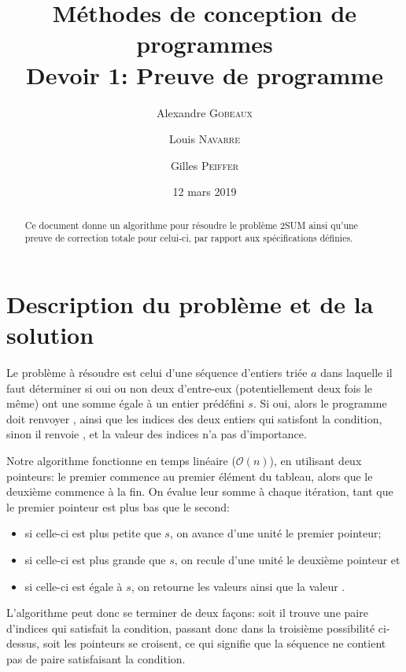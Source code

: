 \documentclass{elsarticle}
\begin{document}
\title{Méthodes de conception de programmes \\ Devoir 1: Preuve de programme}
\date{12 mars 2019}

\address[add1]{École Polytechnique, Université catholique de Louvain, Place de l'Université 1, 1348 Ottignies-Louvain-la-Neuve, Belgique}

\author[add1]{Alexandre \textsc{Gobeaux}}
\author[add1]{Louis \textsc{Navarre}}
\author[add1]{Gilles \textsc{Peiffer}}

\begin{abstract}
Ce document donne un algorithme pour résoudre le problème 2SUM ainsi qu'une preuve de correction totale pour celui-ci, par rapport aux spécifications définies.
\end{abstract}
\maketitle

\section{Description du problème et de la solution}
Le problème à résoudre est celui d'une séquence d'entiers triée $a$ dans laquelle il faut déterminer si oui ou non deux d'entre-eux (potentiellement deux fois le même) ont une somme égale à un entier prédéfini $s$.
Si oui, alors le programme doit renvoyer \og {} \fg, ainsi que les indices des deux entiers qui satisfont la condition, sinon il renvoie \og {} \fg, et la valeur des indices n'a pas d'importance.

Notre algorithme fonctionne en temps linéaire ($\mathcal{O}(n)$), en utilisant deux pointeurs:
le premier commence au premier élément du tableau, alors que le deuxième commence à la fin.
On évalue leur somme à chaque itération, tant que le premier pointeur est plus bas que le second:
\begin{itemize}
	\item si celle-ci est plus petite que $s$, on avance d'une unité le premier pointeur;
	\item si celle-ci est plus grande que $s$, on recule d'une unité le deuxième pointeur et
	\item si celle-ci est égale à $s$, on retourne les valeurs ainsi que la valeur \og {}\fg.
\end{itemize}
L'algorithme peut donc se terminer de deux façons: soit il trouve une paire d'indices qui satisfait la condition, passant donc dans la troisième possibilité ci-dessus,
soit les pointeurs se croisent, ce qui signifie que la séquence ne contient pas de paire satisfaisant la condition.
\end{document}

